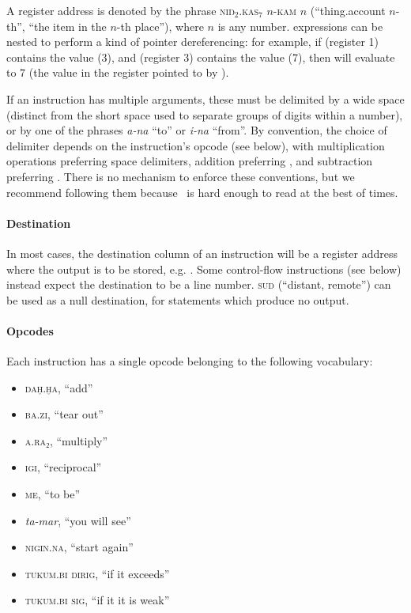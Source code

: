 \documentclass[11pt]{article}
\newcommand{\emeszida}{\textcuneiform{𒅴𒋃𒀀}}
\begin{document}
A register address is denoted by the phrase \textsc{niŋ$_2$.kas$_7$} $n$-\textsc{kam} $n$ (``thing.account $n$-th'', ``the item in the $n$-th place''), where $n$ is any number.  expressions can be nested to perform a kind of pointer dereferencing: for example, if  (register 1) contains the value  (3), and  (register 3) contains the value  (7), then  will evaluate to 7 (the value in the register pointed to by ).

If an instruction has multiple arguments, these must be delimited by a wide space (distinct from the short space used to separate groups of digits within a number), or by one of the phrases \textit{a-na}  ``to'' or \textit{i-na}  ``from''. By convention, the choice of delimiter depends on the instruction's opcode (see below), with multiplication operations preferring space delimiters, addition preferring , and subtraction preferring . 
There is no mechanism to enforce these conventions, but we recommend following them because \emeszida\ is hard enough to read at the best of times.

\paragraph{Destination}
In most cases, the destination column of an instruction will be a register address where the output is to be stored, e.g. . 
Some control-flow instructions (see below) instead expect the destination to be a line number. 
 \textsc{sud} (``distant, remote'') can be used as a null destination, for statements which produce no output.

\paragraph{Opcodes}
Each instruction has a single opcode belonging to the following vocabulary:
\begin{itemize}
    \item {} \textsc{daḫ.ḫa}, ``add''
    \item {} \textsc{ba.zi}, ``tear out''
    \item {} \textsc{a.ra₂}, ``multiply''
    \item {} \textsc{igi}, ``reciprocal''
    \item {} \textsc{me}, ``to be''
    \item {} \textit{ta-mar}, ``you will see''
    \item {} \textsc{nigin.na}, ``start again''
    \item {} \textsc{tukum.bi dirig}, ``if it exceeds''
    \item {}  \textsc{tukum.bi sig}, ``if it it is weak''
\end{itemize}
\end{document}
